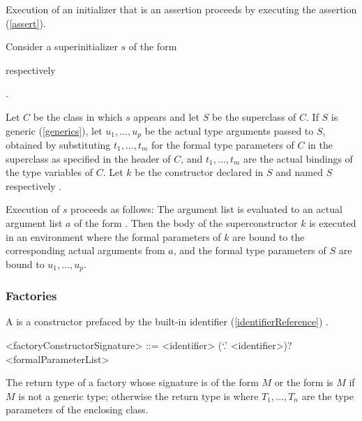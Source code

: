 \documentclass[makeidx]{article}
\begin{document}
\LMHash{}%
Execution of an initializer that is an assertion proceeds by executing the assertion (\ref{assert}).

\LMHash{}%
Consider a superinitializer $s$ of the form

respectively

.

\LMHash{}%
Let $C$ be the class in which $s$ appears and let $S$ be the superclass of $C$.
If $S$ is generic (\ref{generics}),
let $u_1, \ldots, u_p$ be the actual type arguments passed to $S$,
obtained by substituting $t_1, \ldots, t_m$
for the formal type parameters of $C$
in the superclass as specified in the header of $C$, and
$t_1, \ldots, t_m$
are the actual bindings of the type variables of $C$.
Let $k$ be the constructor declared in $S$ and named
$S$ respectively .

\LMHash{}%
Execution of $s$ proceeds as follows:
The argument list
is evaluated to an actual argument list $a$ of the form
.
Then the body of the superconstructor $k$ is executed
in an environment where the formal parameters of $k$ are bound to
the corresponding actual arguments from $a$,
and the formal type parameters of $S$ are bound to $u_1, \ldots, u_p$.


\subsubsection{Factories}

\LMHash{}%
A 
is a constructor prefaced by the built-in identifier
(\ref{identifierReference})
\FACTORY{}.

\begin{grammar}
<factoryConstructorSignature> ::= \gnewline{}
  \FACTORY{} <identifier> (`.' <identifier>)? <formalParameterList>
\end{grammar}


\LMHash{}%
The return type of a factory whose signature is of the form \FACTORY{} $M$ or the form \FACTORY{}  is $M$ if $M$ is not a generic type;
otherwise the return type is  where $T_1, \ldots, T_n$ are the type parameters of the enclosing class.
\end{document}

